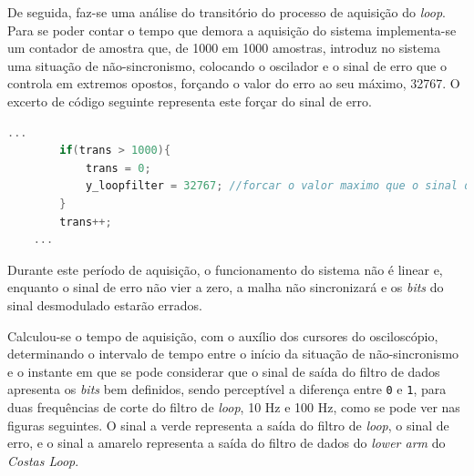 \documentclass[11pt]{article}
\numberwithin{equation}{section}
\begin{document}
De seguida, faz-se uma análise do transitório do processo de aquisição do \textit{loop}. Para se poder contar o tempo que demora a aquisição do sistema implementa-se um contador de amostra que, de 1000 em 1000 amostras, introduz no sistema uma situação de não-sincronismo, colocando o oscilador e o sinal de erro que o controla em extremos opostos, forçando o valor do erro ao seu máximo, 32767. O excerto de código seguinte representa este forçar do sinal de erro.

\begin{lstlisting}[language=C]
	...
		if(trans > 1000){
			trans = 0;
			y_loopfilter = 32767; //forcar o valor maximo que o sinal de erro pode tomar
		}	
		trans++;
	...
\end{lstlisting}

Durante este período de aquisição, o funcionamento do sistema não é linear e, enquanto o sinal de erro não vier a zero, a malha não sincronizará e os \textit{bits} do sinal desmodulado estarão errados.

Calculou-se o tempo de aquisição, com o auxílio dos cursores do osciloscópio, determinando o intervalo de tempo entre o início da situação de não-sincronismo  e o instante em que se pode considerar que o sinal de saída do filtro de dados apresenta os \textit{bits} bem definidos, sendo perceptível a diferença entre \texttt{0} e \texttt{1}, para duas frequências de corte do filtro de \textit{loop}, 10 Hz e 100 Hz, como se pode ver nas figuras seguintes. O sinal a verde representa a saída do filtro de \textit{loop}, o sinal de erro, e o sinal a amarelo representa a saída do filtro de dados do \textit{lower arm} do \textit{Costas Loop}.
\end{document}
